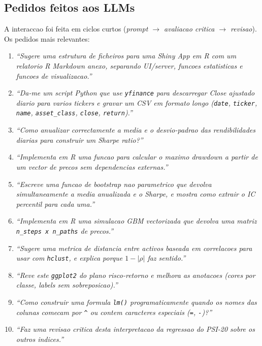\documentclass[11pt,a4paper]{article}
\begin{document}
\subsection*{Pedidos feitos aos LLMs}
A interaccao foi feita em ciclos curtos
(\emph{prompt $\rightarrow$ avaliacao critica $\rightarrow$ revisao}).
Os pedidos mais relevantes:
\begin{enumerate}[leftmargin=*]
  \item \emph{``Sugere uma estrutura de ficheiros para uma Shiny App
        em R com um relatorio R Markdown anexo, separando UI/server,
        funcoes estatisticas e funcoes de visualizacao.''}
  \item \emph{``Da-me um script Python que use \texttt{yfinance} para
        descarregar Close ajustado diario para varios tickers e
        gravar um CSV em formato longo (\texttt{date}, \texttt{ticker},
        \texttt{name}, \texttt{asset\_class}, \texttt{close},
        \texttt{return}).''}
  \item \emph{``Como anualizar correctamente a media e o
        desvio-padrao das rendibilidades diarias para construir um
        Sharpe ratio?''}
  \item \emph{``Implementa em R uma funcao para calcular o maximo
        drawdown a partir de um vector de precos sem dependencias
        externas.''}
  \item \emph{``Escreve uma funcao de bootstrap nao parametrico que
        devolva simultaneamente a media anualizada e o Sharpe, e
        mostra como extrair o IC percentil para cada uma.''}
  \item \emph{``Implementa em R uma simulacao GBM vectorizada que
        devolva uma matriz \texttt{n\_steps x n\_paths} de precos.''}
  \item \emph{``Sugere uma metrica de distancia entre activos baseada
        em correlacoes para usar com \texttt{hclust}, e explica
        porque \mbox{$1 - |\rho|$} faz sentido.''}
  \item \emph{``Reve este \texttt{ggplot2} do plano risco-retorno e
        melhora as anotacoes (cores por classe, \emph{labels} sem
        sobreposicao).''}
  \item \emph{``Como construir uma formula \texttt{lm()}
        programaticamente quando os nomes das colunas comecam por
        \texttt{\^{}} ou contem caracteres especiais (\texttt{=},
        \texttt{-})?''}
  \item \emph{``Faz uma revisao critica desta interpretacao da
        regressao do PSI-20 sobre os outros indices.''}
\end{enumerate}
\end{document}
